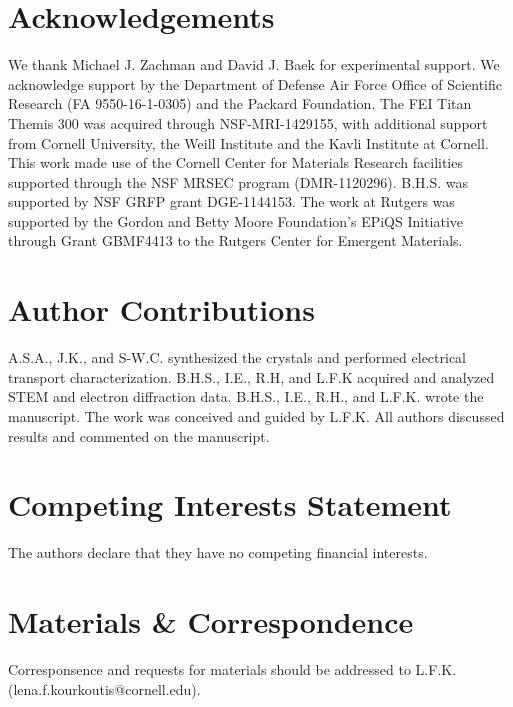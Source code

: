 \documentclass[12pt]{article}
\begin{document}
\clearpage

\section*{Acknowledgements}
We thank Michael J. Zachman and David J. Baek for experimental support.
We acknowledge support by the Department of Defense Air Force Office of Scientific Research (FA 9550-16-1-0305) and the Packard Foundation. 
The FEI Titan Themis 300 was acquired through NSF-MRI-1429155, with additional support from Cornell University, the Weill Institute and the Kavli Institute at Cornell. 
This work made use of the Cornell Center for Materials Research facilities supported through the NSF MRSEC program (DMR-1120296). 
B.H.S. was supported by NSF GRFP grant DGE-1144153.  
The work at Rutgers was supported by the Gordon and Betty Moore Foundation’s EPiQS Initiative through Grant GBMF4413 to the Rutgers Center for Emergent Materials.


\section*{Author Contributions}
A.S.A., J.K., and S-W.C. synthesized the crystals and performed electrical transport characterization.
B.H.S., I.E., R.H, and L.F.K acquired and analyzed STEM and electron diffraction data.
B.H.S., I.E., R.H., and L.F.K. wrote the manuscript.
The work was conceived and guided by L.F.K.
All authors discussed results and commented on the manuscript.


\section*{Competing Interests Statement}
The authors declare that they have no competing financial interests.


\section*{Materials \& Correspondence} 
Corresponsence and requests for materials should be addressed to L.F.K. \newline (lena.f.kourkoutis@cornell.edu).
\end{document}
